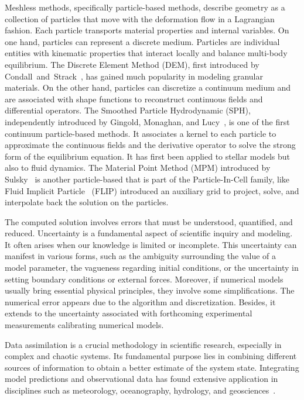 Meshless methods, specifically particle-based methods, describe geometry as a collection of particles that move with the deformation flow in a Lagrangian fashion. Each particle transports material properties and internal variables.
On one hand, particles can represent a discrete medium. Particles are individual entities with kinematic properties that interact locally and balance multi-body equilibrium. The Discrete Element Method (DEM), first introduced by Condall~and~Strack~\cite{cundall_discrete_1979}, has gained much popularity in modeling granular materials.
On the other hand, particles can discretize a continuum medium and are associated with shape functions to reconstruct continuous fields and differential operators. The Smoothed Particle Hydrodynamic (SPH), independently introduced by Gingold, Monaghan, and Lucy~\cite{gingold_monaghan_sph_1977,lucy_1977}, is one of the first continuum particle-based methods. It associates a kernel to each particle to approximate the continuous fields and the derivative operator to solve the strong form of the equilibrium equation. It has first been applied to stellar models but also to fluid dynamics. The Material Point Method (MPM) introduced by Sulsky~\cite{sulsky_particle_1994} is another particle-based that is part of the Particle-In-Cell family, like Fluid Implicit Particle~\cite{brackbill_flip_1988} (FLIP) introduced an auxiliary grid to project, solve, and interpolate back the solution on the particles. \newline

The computed solution involves errors that must be understood, quantified, and reduced.
Uncertainty is a fundamental aspect of scientific inquiry and modeling. It often arises when our knowledge is limited or incomplete. This uncertainty can manifest in various forms, such as the ambiguity surrounding the value of a model parameter, the vagueness regarding initial conditions, or the uncertainty in setting boundary conditions or external forces. Moreover, if numerical models usually bring essential physical principles, they involve some simplifications. The numerical error appears due to the algorithm and discretization.
Besides, it extends to the uncertainty associated with forthcoming experimental measurements calibrating numerical models. \newline

Data assimilation is a crucial methodology in scientific research, especially in complex and chaotic systems. Its fundamental purpose lies in combining different sources of information to obtain a better estimate of the system state. Integrating model predictions and observational data has found extensive application in disciplines such as meteorology, oceanography, hydrology, and geosciences~\cite{bocquet_introduction_2014}.

